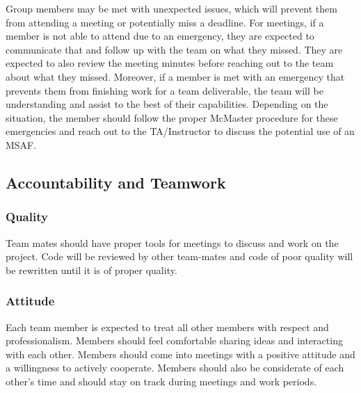 \documentclass{article}
\begin{document}

Group members may be met with unexpected issues, which will prevent them from attending a meeting or potentially miss a deadline. For meetings, if a member is not able to attend due to an emergency, they are expected to communicate that and follow up with the team on what they missed. They are expected to also review the meeting minutes before reaching out to the team about what they missed. Moreover, if a member is met with an emergency that prevents them from finishing work for a team deliverable, the team will be understanding and assist to the best of their capabilities. Depending on the situation, the member should follow the proper McMaster procedure for these emergencies and reach out to the TA/Instructor to discuss the potential use of an MSAF.

\subsection*{Accountability and Teamwork}

\subsubsection*{Quality} 

Team mates should have proper tools for meetings to discuss and work on the project.
Code will be reviewed by other team-mates and code of poor quality will be rewritten  until it is of proper quality.

\subsubsection*{Attitude}


Each team member is expected to treat all other members with respect and professionalism. Members should feel comfortable sharing ideas and interacting with each other. Members should come into meetings with a positive attitude and a willingness to actively cooperate. Members should also be considerate of each other’s time and should stay on track during meetings and work periods.\\
\end{document}
